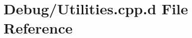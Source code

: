 \hypertarget{_debug_2_utilities_8cpp_8d}{\section{\-Debug/\-Utilities.cpp.\-d \-File \-Reference}
\label{_debug_2_utilities_8cpp_8d}
}
